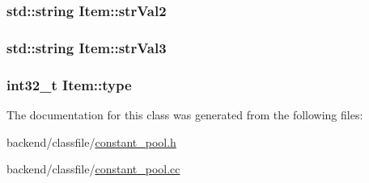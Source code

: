 \hypertarget{classItem_a44fde30371f8000e026420c69ed37236}{
\subsubsection[{str\-Val2}]{\setlength{\rightskip}{0pt plus 5cm}std\-::string Item\-::str\-Val2}}\label{classItem_a44fde30371f8000e026420c69ed37236}
\hypertarget{classItem_ae1567b4fa0100b38469c1cdef4c705d2}{
\subsubsection[{str\-Val3}]{\setlength{\rightskip}{0pt plus 5cm}std\-::string Item\-::str\-Val3}}\label{classItem_ae1567b4fa0100b38469c1cdef4c705d2}
\hypertarget{classItem_ad16d911a86476ef205aaa08dbc0af182}{
\subsubsection[{type}]{\setlength{\rightskip}{0pt plus 5cm}int32\-\_\-t Item\-::type}}\label{classItem_ad16d911a86476ef205aaa08dbc0af182}


The documentation for this class was generated from the following files\-:\begin{DoxyCompactItemize}
\item 
backend/classfile/\hyperlink{constant__pool_8h}{constant\-\_\-pool.\-h}\item 
backend/classfile/\hyperlink{constant__pool_8cc}{constant\-\_\-pool.\-cc}\end{DoxyCompactItemize}
